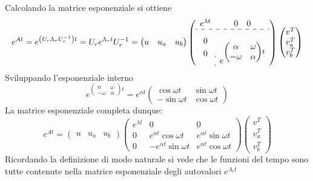 Calcolando la matrice esponenziale si ottiene
$$
e^{At} = e^{\left(U_r\Lambda_r U_r^{-1} \right)t} = U_r e^{\Lambda_r t}U_r^{-1}
= \begin{pmatrix}
   u & u_a & u_b
  \end{pmatrix}\left(
\begin{array}{c:c}
 e^{\lambda t}& 0 \quad 0 \\ \hdashline
\begin{aligned}
0 \\ 0
\end{aligned} &\begin{aligned} \\ e^{\begin{pmatrix}
\alpha& \omega\\
-\omega & \alpha
\end{pmatrix}t}\end{aligned}
\end{array}\right)
\begin{pmatrix}
v^T \\ v_a^T \\ v_b^T
\end{pmatrix}
$$
Sviluppando l'esponenziale interno
$$
e^{\begin{pmatrix}
\alpha& \omega\\
-\omega & \alpha
\end{pmatrix}t} =
e^{\alpha t} \begin{pmatrix}
              \cos \omega t & \sin \omega t \\
              -\sin \omega t & \cos \omega t
             \end{pmatrix}
$$
La matrice esponenziale completa dunque:
$$
e^{At} = \begin{pmatrix}
   u & u_a & u_b
  \end{pmatrix}
\begin{pmatrix}
e^{\lambda t} & 0 & 0 \\
0 & e^{\alpha t}\cos\omega t & e^{\alpha t}\sin\omega t \\
0 & -e^{\alpha t}\sin\omega t & e^{\alpha t}\cos\omega t
\end{pmatrix}
\begin{pmatrix}
v^T \\ v_a^T \\ v_b^T
\end{pmatrix}
$$
Ricordando la definizione di modo naturale si vede che le funzioni del tempo
sono tutte contenute nella matrice esponenziale degli autovalori
$e^{\Lambda_r t}$

